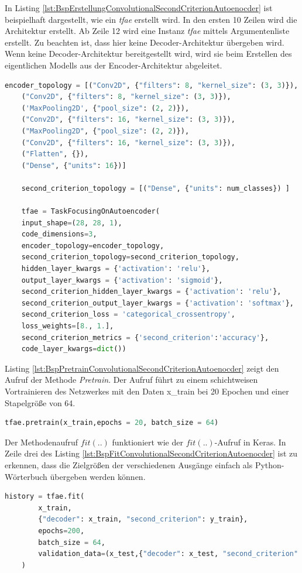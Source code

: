 	In Listing \ref{lst:BspErstellungConvolutionalSecondCriterionAutoenocder} ist beispielhaft dargestellt, wie ein  \textit{\ac{tfae}} erstellt wird. In den ersten 10 Zeilen wird die Architektur erstellt. Ab Zeile 12 wird eine Instanz  \textit{\ac{tfae}} mittels Argumentenliste erstellt. Zu beachten ist, dass hier keine Decoder-Architektur übergeben wird. Wenn keine Decoder-Architektur bereitgestellt wird, wird sie beim Erstellen des eigentlichen Modells aus der Encoder-Architektur abgeleitet.
	\begin{lstlisting}[language=python,caption=Beispiel Erstellung ConvolutionalSecondCriterionAutoenocder in Python, label=lst:BspErstellungConvolutionalSecondCriterionAutoenocder]
	encoder_topology = [("Conv2D", {"filters": 8, "kernel_size": (3, 3)}),
	("Conv2D", {"filters": 8, "kernel_size": (3, 3)}),
	('MaxPooling2D', {"pool_size": (2, 2)}),
	("Conv2D", {"filters": 16, "kernel_size": (3, 3)}),
	("MaxPooling2D", {"pool_size": (2, 2)}),
	("Conv2D", {"filters": 16, "kernel_size": (3, 3)}),
	("Flatten", {}),
	("Dense", {"units": 16})]

	second_criterion_topology = [("Dense", {"units": num_classes}) ]

	tfae = TaskFocusingOnAutoencoder(
	input_shape=(28, 28, 1),	
	code_dimensions=3, 
	encoder_topology=encoder_topology,
	second_criterion_topology=second_criterion_topology,
	hidden_layer_kwargs = {'activation': 'relu'},
	output_layer_kwargs = {'activation': 'sigmoid'},
	second_criterion_hidden_layer_kwargs = {'activation': 'relu'},
	second_criterion_output_layer_kwargs = {'activation': 'softmax'},
	second_criterion_loss = 'categorical_crossentropy',
	loss_weights=[8., 1.],
	second_criterion_metrics = {'second_criterion':'accuracy'},
	code_layer_kwargs=dict())
	\end{lstlisting}
	Listing  \ref{lst:BspPretrainConvolutionalSecondCriterionAutoenocder}  zeigt den Aufruf der Methode \textit{Pretrain}. Der Aufruf führt zu einem schichtweisen Vortrainieren des Netzwerkes mit den Daten x\_train bei 20 Epochen und einer Stapelgröße von 64. 
	\begin{lstlisting}[language=python,caption=Beispielaufruf Pretrain  in Python, label=lst:BspPretrainConvolutionalSecondCriterionAutoenocder]
	tfae.pretrain(x_train,epochs = 20, batch_size = 64)
	\end{lstlisting}

	Der Methodenaufruf $fit(..)$ funktioniert wie der $fit(..)$-Aufruf in Keras. In Zeile drei des Listing  \ref{lst:BspFitConvolutionalSecondCriterionAutoenocder}  ist zu erkennen, dass die Zielgrößen der verschiedenen Ausgänge einfach als Python-Wörterbuch übergeben werden können.
	\begin{lstlisting}[language=python,caption=Beispielaufruf Fit  in Python, label=lst:BspFitConvolutionalSecondCriterionAutoenocder]
	history = tfae.fit(
		x_train,
		{"decoder": x_train, "second_criterion": y_train}, 
		epochs=200,
		batch_size = 64,
		validation_data=(x_test,{"decoder": x_test, "second_criterion": y_test})
	)
	\end{lstlisting}

